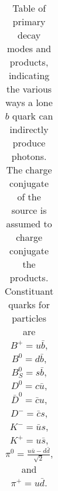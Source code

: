\documentclass{article}
\DeclareMathOperator{\any}{\text{any}}
\begin{document}
\begin{table}
\begin{tabular}{lcclr}
\end{tabular}
\caption{
  Table of primary decay modes and products, indicating the various ways a lone $b$ quark can indirectly produce photons.
  The charge conjugate of the source is assumed to charge conjugate the products.
  Constituant quarks for particles are $B^+=u\bar{b}$, $B^0=d\bar{b}$, $B^0_S=s\bar{b}$, $D^0=c\bar{u}$, $\bar{D}^0=\bar{c}u$, $D^-=\bar{c}s$, $K^-=\bar{u}s$, $K^+=u\bar{s}$, $\pi^0=\frac{u\bar{u}-d\bar{d}}{\sqrt{2}}$, and $\pi^+=u\bar{d}$.
  }
\end{table}
\end{document}
